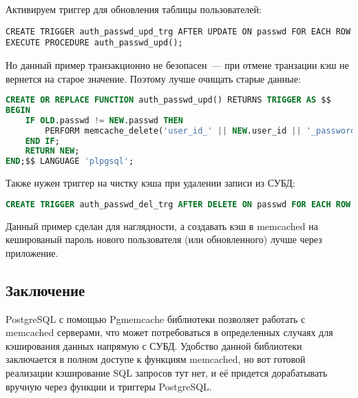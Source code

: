Активируем триггер для обновления таблицы пользователей:

\begin{lstlisting}[label=lst:pgcache12,caption=Триггер]
CREATE TRIGGER auth_passwd_upd_trg AFTER UPDATE ON passwd FOR EACH ROW EXECUTE PROCEDURE auth_passwd_upd();
\end{lstlisting}

Но данный пример транзакционно не безопасен~--- при отмене транзации кэш не вернется на старое значение. Поэтому лучше очищать старые данные:

\begin{lstlisting}[language=SQL,label=lst:pgcache13,caption=Очистка ключа в кэше]
CREATE OR REPLACE FUNCTION auth_passwd_upd() RETURNS TRIGGER AS $$
BEGIN
	IF OLD.passwd != NEW.passwd THEN
		PERFORM memcache_delete('user_id_' || NEW.user_id || '_password');
	END IF;
	RETURN NEW;
END;$$ LANGUAGE 'plpgsql';
\end{lstlisting}

Также нужен триггер на чистку кэша при удалении записи из СУБД:

\begin{lstlisting}[language=SQL,label=lst:pgcache14,caption=Триггер]
CREATE TRIGGER auth_passwd_del_trg AFTER DELETE ON passwd FOR EACH ROW EXECUTE PROCEDURE auth_passwd_upd();
\end{lstlisting}

Данный пример сделан для наглядности, а создавать кэш в memcached на кешированый пароль нового пользователя (или обновленного) лучше через приложение.


\subsection{Заключение}

PostgreSQL с помощью Pgmemcache библиотеки позволяет работать с memcached серверами, что может потребоваться в определенных случаях для кэширования данных напрямую с СУБД. Удобство данной библиотеки заключается в полном доступе к функциям memcached, но вот готовой реализации кэширование SQL запросов тут нет, и её придется дорабатывать вручную через функции и триггеры PostgreSQL.
